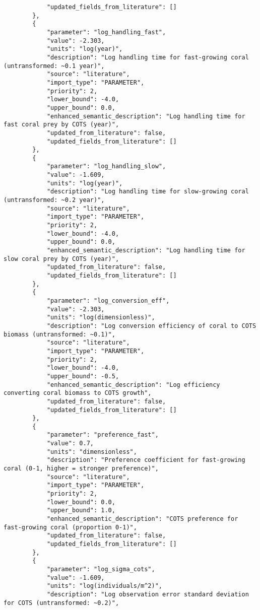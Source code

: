 \begin{lstlisting}
            "updated_fields_from_literature": []
        },
        {
            "parameter": "log_handling_fast",
            "value": -2.303,
            "units": "log(year)",
            "description": "Log handling time for fast-growing coral (untransformed: ~0.1 year)",
            "source": "literature",
            "import_type": "PARAMETER",
            "priority": 2,
            "lower_bound": -4.0,
            "upper_bound": 0.0,
            "enhanced_semantic_description": "Log handling time for fast coral prey by COTS (year)",
            "updated_from_literature": false,
            "updated_fields_from_literature": []
        },
        {
            "parameter": "log_handling_slow",
            "value": -1.609,
            "units": "log(year)",
            "description": "Log handling time for slow-growing coral (untransformed: ~0.2 year)",
            "source": "literature",
            "import_type": "PARAMETER",
            "priority": 2,
            "lower_bound": -4.0,
            "upper_bound": 0.0,
            "enhanced_semantic_description": "Log handling time for slow coral prey by COTS (year)",
            "updated_from_literature": false,
            "updated_fields_from_literature": []
        },
        {
            "parameter": "log_conversion_eff",
            "value": -2.303,
            "units": "log(dimensionless)",
            "description": "Log conversion efficiency of coral to COTS biomass (untransformed: ~0.1)",
            "source": "literature",
            "import_type": "PARAMETER",
            "priority": 2,
            "lower_bound": -4.0,
            "upper_bound": -0.5,
            "enhanced_semantic_description": "Log efficiency converting coral biomass to COTS growth",
            "updated_from_literature": false,
            "updated_fields_from_literature": []
        },
        {
            "parameter": "preference_fast",
            "value": 0.7,
            "units": "dimensionless",
            "description": "Preference coefficient for fast-growing coral (0-1, higher = stronger preference)",
            "source": "literature",
            "import_type": "PARAMETER",
            "priority": 2,
            "lower_bound": 0.0,
            "upper_bound": 1.0,
            "enhanced_semantic_description": "COTS preference for fast-growing coral (proportion 0-1)",
            "updated_from_literature": false,
            "updated_fields_from_literature": []
        },
        {
            "parameter": "log_sigma_cots",
            "value": -1.609,
            "units": "log(individuals/m^2)",
            "description": "Log observation error standard deviation for COTS (untransformed: ~0.2)",

\end{lstlisting}
